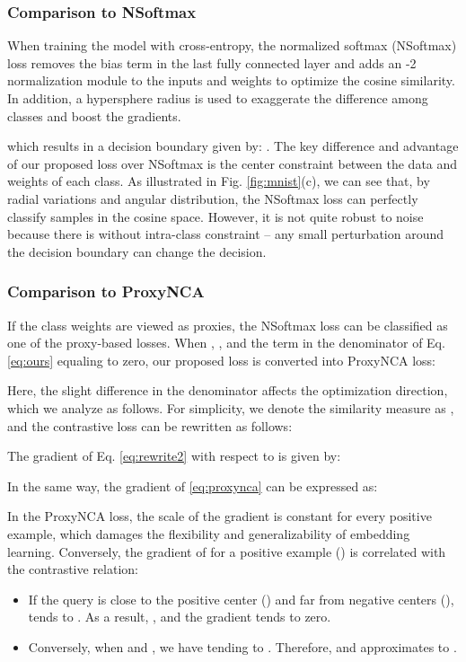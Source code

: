 \documentclass[10pt,twocolumn,letterpaper]{article}
\begin{document}
\subsubsection{Comparison to NSoftmax}\label{sec:nsoftmax}
When training the model with cross-entropy, the normalized softmax (NSoftmax) loss \cite{nsoftmax} removes the bias term  in the last fully connected layer and adds an -2 normalization module to the inputs  and weights  to optimize the cosine similarity. In addition, a hypersphere radius  is used to exaggerate the difference among classes and boost the gradients. 

which results in a decision boundary given by: . The key difference and advantage of our proposed loss over NSoftmax is the center constraint between the data and weights of each class. As illustrated in Fig. \ref{fig:mnist}(c), we can see that, by radial variations and angular distribution, the NSoftmax loss can perfectly classify samples in the cosine space. However, it is not quite robust to noise because there is without intra-class constraint -- any small perturbation around the decision boundary can change the decision.

\subsubsection{Comparison to ProxyNCA}\label{sec:proxynca}
If the class weights  are viewed as proxies, the NSoftmax loss can be classified as one of the proxy-based losses. When , , and the term  in the denominator of Eq. \eqref{eq:ours} equaling to zero, our proposed loss is converted into ProxyNCA loss:

Here, the slight difference in the denominator affects the optimization direction, which we analyze as follows. For simplicity, we denote the similarity measure as , and the contrastive loss  can be rewritten as follows:

The gradient of Eq. \eqref{eq:rewrite2} with respect to  is given by:

In the same way, the gradient of \eqref{eq:proxynca} can be expressed as:

In the ProxyNCA loss, the scale of the gradient is constant for every positive example, which damages the flexibility and generalizability of embedding learning. Conversely, the gradient of  for a positive example () is correlated with the contrastive relation:
\begin{itemize}[itemsep=2pt,topsep=0pt,parsep=0pt]
\item If the query is close to the positive center () and far from negative centers (),  tends to . As a result, , and the gradient tends to zero.
\item Conversely, when  and , we have  tending to . Therefore,  and  approximates to . 
\end{itemize}
\end{document}
